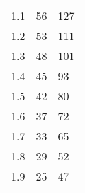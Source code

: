 \begin{table}[H]
{\begin{tabular}{|l|l|l|}
1.1                      & 56                                                                                                                  & 127                                                                                                                \\
1.2                      & 53                                                                                                                  & 111                                                                                                                \\
1.3                      & 48                                                                                                                  & 101                                                                                                                \\
1.4                      & 45                                                                                                                  & 93                                                                                                                 \\
1.5                      & 42                                                                                                                  & 80                                                                                                                 \\
1.6                      & 37                                                                                                                  & 72                                                                                                                 \\
1.7                      & 33                                                                                                                  & 65                                                                                                                 \\
1.8                      & 29                                                                                                                  & 52                                                                                                                 \\
1.9                      & 25                                                                                                                  & 47                                                                                                                 \\

\end{tabular}}
\end{table}
